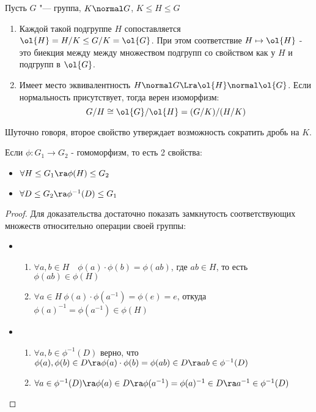 \begin{theorem}
	Пусть $G$ "--- группа, $K \normal G$, $K \le H \le G$
	\begin{enumerate}
		\item Каждой такой подгруппе $H$ сопоставляется $\ol{H} = H / K \le G / K = \ol{G}$.
		При этом соответствие $H \mapsto \ol{H}$ - это биекция между между множеством подгрупп со свойством как у $H$ и подгрупп в $\ol{G}$.
		
		\item Имеет место эквивалентность $H \normal G \Lra \ol{H} \normal \ol{G}$. Если нормальность присутствует, тогда верен изоморфизм:
		\[
			G / H \cong \ol{G} / \ol{H} = (G / K) / (H / K)
		\]
	\end{enumerate}
\end{theorem}

\begin{note}
	Шуточно говоря, второе свойство утверждает возможность сократить дробь на $K$.
\end{note}

\begin{proposition}
	Если $\phi \colon G_1 \to G_2$ - гомоморфизм, то есть 2 свойства:
	\begin{itemize}
		\item \(\forall H \le G_1 \ra \phi(H) \le G_2\)
		
		\item \(\forall D \le G_2 \ra \phi^{-1}(D) \le G_1\)
	\end{itemize}
\end{proposition}

\begin{proof}
	Для доказательства достаточно показать замкнутость соответствующих множеств относительно операции своей группы:
	\begin{itemize}
		\item \begin{enumerate}
			\item \(\forall a, b \in H \quad \phi(a) \cdot \phi(b) = \phi(ab)\), где $ab \in H$, то есть $\phi(ab) \in \phi(H)$
			
			\item \(\forall a \in H\ \phi(a) \cdot \phi(a^{-1}) = \phi(e) = e\), откуда $\phi(a)^{-1} = \phi(a^{-1}) \in \phi(H)$
		\end{enumerate}
		
		\item \begin{enumerate}
			\item \(\forall a, b \in \phi^{-1}(D)\) верно, что $\phi(a), \phi(b) \in D \ra \phi(a) \cdot \phi(b) = \phi(ab) \in D \ra ab \in \phi^{-1}(D)$
			
			\item \(\forall a \in \phi^{-1}(D) \ra \phi(a) \in D \ra \phi(a^{-1}) = \phi(a)^{-1} \in D \ra a^{-1} \in \phi^{-1}(D)\)
		\end{enumerate}
	\end{itemize}
\end{proof}

